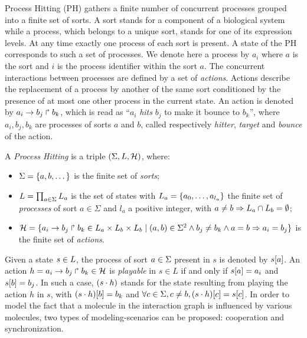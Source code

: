 

Process Hitting (PH) gathers a finite number of concurrent processes grouped into a finite set of sorts.
A sort stands for a component of a biological system while a process, which belongs to a unique sort, stands
for one of its expression levels. At any time exactly one process of each sort is present. A state of the 
PH corresponds to such a set of processes. We denote here a process by $a_i$ where $a$ 
is the sort and $i$ is the process identifier within the sort $a$.
The concurrent interactions between processes are defined by a set of \emph{actions}.
Actions describe the replacement of a process by another of the same sort conditioned by the presence 
of at most one other process in the current state. An action is denoted by $a_i\rightarrow b_j\Rsh b_k$, 
which is read as ``$a_i$ \emph{hits} $b_j$ to make it bounce to $b_k$'', where $a_i,b_j,b_k$ are 
processes of sorts $a$ and $b$, called respectively \emph{hitter}, \emph{target} and \emph{bounce} of 
the action.

\begin{definition} \label{def:PH}
A \emph{Process Hitting} is a triple $(\Sigma,L,\mathcal{H})$, where:
\begin{itemize}
\item $\Sigma = \{a,b,\dots\}$ is the finite set of \emph{sorts};
\item $L = \prod_{a\in\Sigma} L_a$ is the set of states with $L_a = \{a_0,\dots,a_{l_a}\}$
the finite set of \emph{processes} of sort $a\in\Sigma$ and $l_a$ a positive integer, with $a\neq b\Rightarrow L_a \cap L_b = \emptyset$;
\item $\mathcal{H} = \{ a_i\rightarrow b_j\Rsh b_k \in L_a \times L_b \times L_b \mid (a,b) \in \Sigma^2
  \wedge b_j\neq b_k \wedge a=b\Rightarrow a_i=b_j\}$ is the finite set of \emph{actions}.
\end{itemize}
\end{definition}

\noindent
Given a state $s\in L$, the process of sort $a\in\Sigma$ present in $s$ is denoted by ${s[a]}$.
An action $h=a_i\rightarrow b_j\Rsh b_k \in \mathcal{H}$ is \emph{playable} in $s \in L$ if and only if ${s[a]}=a_i$ and ${s[b]} = b_j$.
In such a case, $(s\cdot h)$ stands for the state resulting from playing the action $h$ in $s$, with
${(s\cdot h)[b]} = b_k$ and $\forall c \in \Sigma, c \neq b, {(s\cdot h)[c]} = {s[c]}$.
In order to model the fact that a molecule in the interaction graph is influenced by various molecules, two 
types of modeling-scenarios can be proposed: cooperation and synchronization.

